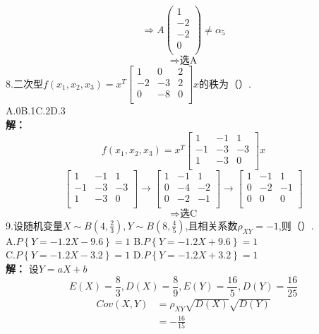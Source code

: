 \documentclass[a4paper]{article}
\begin{document}
$$\Rightarrow A\begin{pmatrix}
    1\\
    -2\\
    -2\\
    0\\
\end{pmatrix} \neq \alpha_5$$
$$\Rightarrow \text{选A}$$
8.二次型$f\left(x_1,x_2,x_3\right)=x^T \begin{bmatrix}
    1&0&2\\
    -2&-3&2\\
    0&-8&0\\
\end{bmatrix}x$的秩为（\quad）.\\
A.0\hfill B.1\hfill C.2\hfill D.3\\
\textbf{解：}
$$f\left(x_1,x_2,x_3\right)=x^T \begin{bmatrix}
    1&-1&1\\
    -1&-3&-3\\
    1&-3&0\\
\end{bmatrix}x$$
$$\begin{bmatrix}
    1&-1&1\\
    -1&-3&-3\\
    1&-3&0\\
\end{bmatrix} \rightarrow \begin{bmatrix}
    1&-1&1\\
    0&-4&-2\\
    0&-2&-1\\
\end{bmatrix} \rightarrow \begin{bmatrix}
    1&-1&1\\
    0&-2&-1\\
    0&0&0\\
\end{bmatrix}$$
$$\Rightarrow \text{选C}$$
\newpage
\noindent
9.设随机变量$X\sim B\left(4,\frac{2}{3}\right),Y\sim B\left(8,\frac{4}{5}\right)$,且相关系数$\rho_{XY}=-1$,则（\quad）.\\
A.$P\left\{Y=-1.2X-9.6\right\}=1$\hfill
B.$P\left\{Y=-1.2X+9.6\right\}=1$\\
C.$P\left\{Y=-1.2X-3.2\right\}=1$\hfill
D.$P\left\{Y=-1.2X+3.2\right\}=1$\\
\textbf{解：}
  设$Y=aX+b$
  $$E(X)=\frac{8}{3},D(X)=\frac{8}{9},E(Y)=\frac{16}{5},D(Y)=\frac{16}{25}$$
  \begin{align*}
    Cov(X,Y)&=\rho_{XY}\sqrt{D(X)}\sqrt{D(Y)}\\
            &=-\frac{16}{15}
  \end{align*}
\end{document}
